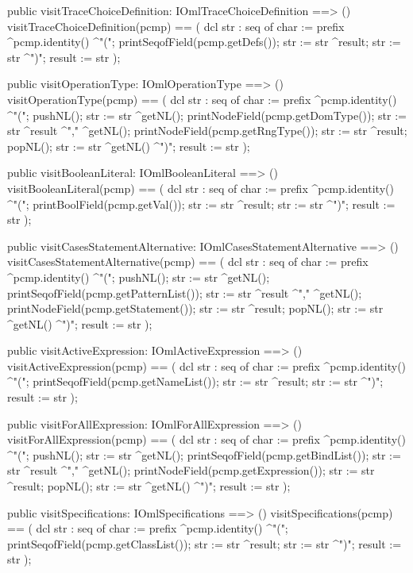 \begin{vdm_al}
  public visitTraceChoiceDefinition: IOmlTraceChoiceDefinition ==> ()
  visitTraceChoiceDefinition(pcmp) ==
    ( dcl str : seq of char := prefix ^pcmp.identity() ^"(";
      printSeqofField(pcmp.getDefs());
      str := str ^result;
      str := str ^")";
      result := str );

  public visitOperationType: IOmlOperationType ==> ()
  visitOperationType(pcmp) ==
    ( dcl str : seq of char := prefix ^pcmp.identity() ^"(";
      pushNL();
      str := str ^getNL();
      printNodeField(pcmp.getDomType());
      str := str ^result ^"," ^getNL();
      printNodeField(pcmp.getRngType());
      str := str ^result;
      popNL();
      str := str ^getNL() ^")";
      result := str );

  public visitBooleanLiteral: IOmlBooleanLiteral ==> ()
  visitBooleanLiteral(pcmp) ==
    ( dcl str : seq of char := prefix ^pcmp.identity() ^"(";
      printBoolField(pcmp.getVal());
      str := str ^result;
      str := str ^")";
      result := str );

  public visitCasesStatementAlternative: IOmlCasesStatementAlternative ==> ()
  visitCasesStatementAlternative(pcmp) ==
    ( dcl str : seq of char := prefix ^pcmp.identity() ^"(";
      pushNL();
      str := str ^getNL();
      printSeqofField(pcmp.getPatternList());
      str := str ^result ^"," ^getNL();
      printNodeField(pcmp.getStatement());
      str := str ^result;
      popNL();
      str := str ^getNL() ^")";
      result := str );

  public visitActiveExpression: IOmlActiveExpression ==> ()
  visitActiveExpression(pcmp) ==
    ( dcl str : seq of char := prefix ^pcmp.identity() ^"(";
      printSeqofField(pcmp.getNameList());
      str := str ^result;
      str := str ^")";
      result := str );

  public visitForAllExpression: IOmlForAllExpression ==> ()
  visitForAllExpression(pcmp) ==
    ( dcl str : seq of char := prefix ^pcmp.identity() ^"(";
      pushNL();
      str := str ^getNL();
      printSeqofField(pcmp.getBindList());
      str := str ^result ^"," ^getNL();
      printNodeField(pcmp.getExpression());
      str := str ^result;
      popNL();
      str := str ^getNL() ^")";
      result := str );

  public visitSpecifications: IOmlSpecifications ==> ()
  visitSpecifications(pcmp) ==
    ( dcl str : seq of char := prefix ^pcmp.identity() ^"(";
      printSeqofField(pcmp.getClassList());
      str := str ^result;
      str := str ^")";
      result := str );


\end{vdm_al}

